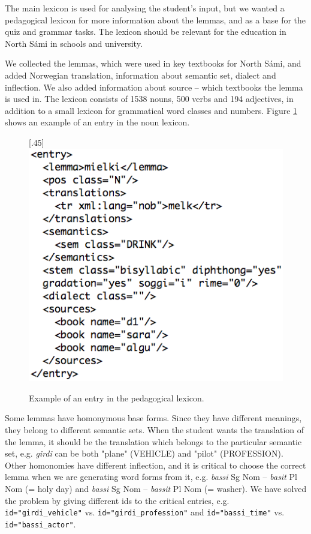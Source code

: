 \documentclass[11pt]{article}
\begin{document}
The main lexicon is used for analysing the student's input, but we wanted a pedagogical lexicon for more information about the lemmas, and as a base for the quiz and grammar tasks. The lexicon should be relevant for the education in North Sámi in schools and university. 

We collected the lemmas, which were used in key textbooks for North Sámi, and added Norwegian translation, information about semantic set, dialect and inflection. We also added information about source -- which textbooks the lemma is used in. %
The lexicon consists of 1538 nouns, 500 verbs and 194 adjectives, in addition to a small lexicon for grammatical word classes and numbers. Figure \ref{nounlex} shows an example of an entry in the noun lexicon. \\

\begin{figure}[tbp]
\begin{center}
\scalebox{.45}[.45]{\includegraphics{presentation/img/nounlexicon2.png}}\\
\caption{Example of an entry in the pedagogical lexicon.}
\label{nounlex}
\end{center}
\end{figure}

Some lemmas have homonymous base forms. Since they have different meanings, they belong to different semantic sets. When the student wants the translation of the lemma, it should be the translation which belongs to the particular semantic set, e.g. \textit{girdi} can be both "plane" (VEHICLE) and "pilot" (PROFESSION). Other homonomies have different inflection, and it is critical to choose the correct lemma when we are generating word forms from it, e.g. \textit{bassi} Sg Nom -- \textit{basit} Pl Nom (= holy day) and \textit{bassi} Sg Nom -- \textit{bassit} Pl Nom (= washer). We have solved the problem by giving different ids to the critical entries, e.g. \texttt{id="girdi\_vehicle"} vs. 
\texttt{id="girdi\_profession"} and \texttt{id="bassi\_time"} vs. \texttt{id="bassi\_actor"}.
\end{document}
